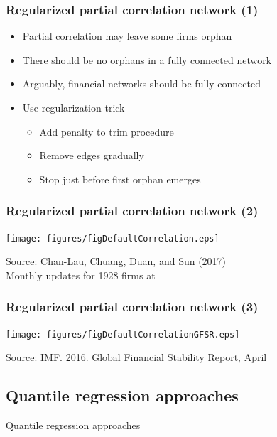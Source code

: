 \documentclass[aspectratio=43,dvipsnames,usenames, svgnames]{beamer}
\begin{document}
\begin{frame} %
\frametitle{Regularized partial correlation network (1)}
\begin{itemize}
	\item Partial correlation may leave some firms orphan
	\smallskip
	\item There should be no orphans in a fully connected network
	\smallskip
	\item Arguably, financial networks should be fully connected
	\smallskip
	\item Use regularization trick
	\begin{itemize}
		\item Add penalty to trim procedure
		\item Remove edges gradually
		\item Stop just before first orphan emerges
	\end{itemize}
\end{itemize}
\end{frame}

\begin{frame} %
\frametitle{Regularized partial correlation network (2)}
\begin{center}
	\texttt{[image: figures/figDefaultCorrelation.eps]}
\end{center}
\tiny{Source: Chan-Lau, Chuang, Duan, and Sun (2017)\\
Monthly updates for 1928 firms at }
\end{frame}

\begin{frame} %
\frametitle{Regularized partial correlation network (3)}
\begin{center}
	\texttt{[image: figures/figDefaultCorrelationGFSR.eps]}
\end{center}
\tiny{Source: IMF. 2016. Global Financial Stability Report, April}
\end{frame}

\subsection{Quantile regression approaches}

\begin{frame} %
\begin{center}
	\Large{Quantile regression approaches}
\end{center}
\end{frame}
\end{document}
